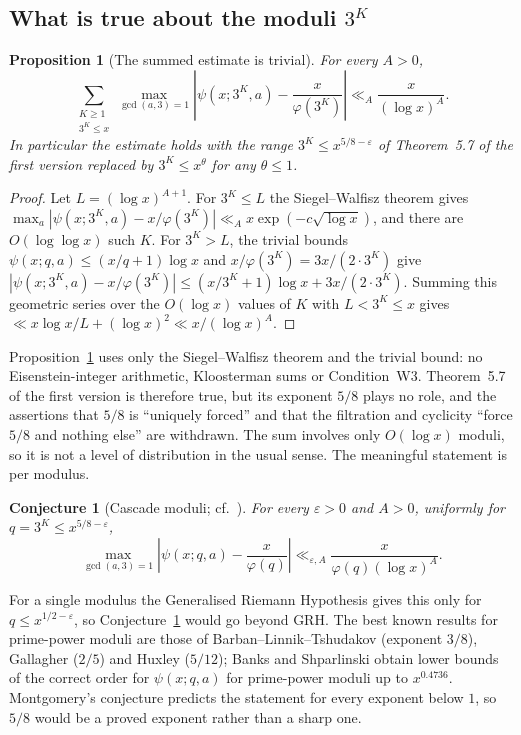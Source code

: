 \documentclass[12pt]{amsart}
\theoremstyle{plain}
\newtheorem{proposition}[theorem]{Proposition}
\newtheorem{conjecture}[theorem]{Conjecture}
\theoremstyle{definition}
\theoremstyle{remark}
\begin{document}
\subsection{What is true about the moduli $3^K$}

\begin{proposition}[The summed estimate is trivial]
\label{prop:trivial}
For every $A > 0$,
\[
  \sum_{\substack{K \geq 1 \\ 3^K \leq x}}
  \max_{\gcd(a,3)=1}
  \left| \psi(x;3^K,a) - \frac{x}{\varphi(3^K)} \right|
  \ll_A \frac{x}{(\log x)^A}.
\]
In particular the estimate holds with the range $3^K \leq x^{5/8-\varepsilon}$
of Theorem~5.7 of the first version replaced by $3^K \leq x^{\theta}$ for any
$\theta \leq 1$.
\end{proposition}

\begin{proof}
Let $L = (\log x)^{A+1}$. For $3^K \leq L$ the Siegel--Walfisz theorem gives
$\max_a |\psi(x;3^K,a) - x/\varphi(3^K)| \ll_A x\exp(-c\sqrt{\log x})$, and there
are $O(\log\log x)$ such $K$. For $3^K > L$, the trivial bounds
$\psi(x;q,a) \leq (x/q + 1)\log x$ and $x/\varphi(3^K) = 3x/(2 \cdot 3^K)$ give
$|\psi(x;3^K,a) - x/\varphi(3^K)| \leq (x/3^K + 1)\log x + 3x/(2 \cdot 3^K)$.
Summing this geometric series over the $O(\log x)$ values of $K$ with
$L < 3^K \leq x$ gives $\ll x\log x/L + (\log x)^2 \ll x/(\log x)^A$.
\end{proof}

Proposition~\ref{prop:trivial} uses only the Siegel--Walfisz theorem and the
trivial bound: no Eisenstein-integer arithmetic, Kloosterman sums or
Condition~W3. Theorem~5.7 of the first version is therefore true, but its
exponent $5/8$ plays no role, and the assertions that $5/8$ is ``uniquely
forced'' and that the filtration and cyclicity ``force $5/8$ and nothing else''
are withdrawn. The sum involves only $O(\log x)$ moduli, so it is not a level of
distribution in the usual sense. The meaningful statement is per modulus.

\begin{conjecture}[Cascade moduli; cf.~\cite{WakilEisenstein}]
\label{conj:cascade}
For every $\varepsilon > 0$ and $A > 0$, uniformly for $q = 3^K \leq
x^{5/8-\varepsilon}$,
\[
  \max_{\gcd(a,3)=1} \left| \psi(x;q,a) - \frac{x}{\varphi(q)} \right|
  \ll_{\varepsilon,A} \frac{x}{\varphi(q)(\log x)^A}.
\]
\end{conjecture}

For a single modulus the Generalised Riemann Hypothesis gives this only for
$q \leq x^{1/2-\varepsilon}$, so Conjecture~\ref{conj:cascade} would go beyond
GRH. The best known results for prime-power moduli are those of
Barban--Linnik--Tshudakov (exponent $3/8$), Gallagher ($2/5$) and Huxley
($5/12$); Banks and Shparlinski obtain lower bounds of the correct order for
$\psi(x;q,a)$ for prime-power moduli up to $x^{0.4736}$. Montgomery's conjecture predicts the statement for every exponent
below $1$, so $5/8$ would be a proved exponent rather than a sharp one.
\end{document}
